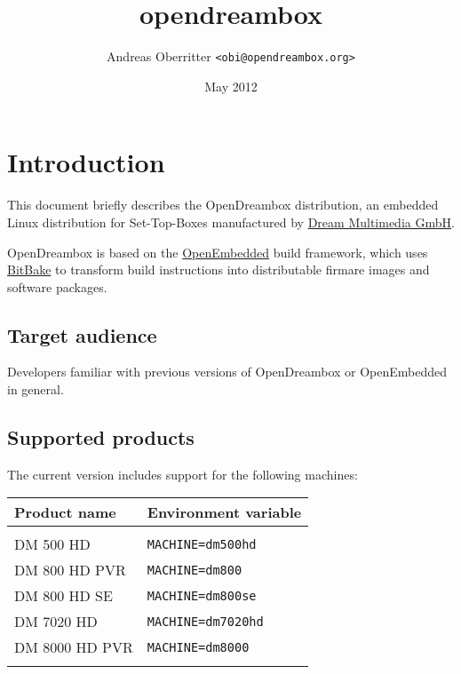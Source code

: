 \documentclass[a4paper]{article}
\newcommand{\shell}[1]{\texttt{\small #1}}
\begin{document}
\title{opendreambox}
\author{Andreas Oberritter \shell{<obi@opendreambox.org>}}
\date{May 2012}
\maketitle
\tableofcontents
\pagebreak

\section{Introduction}
  \begin{flushleft}
    This document briefly describes the OpenDreambox distribution, an embedded Linux
    distribution for Set-Top-Boxes manufactured by \href{http://www.dream-multimedia-tv.de/}{Dream Multimedia GmbH}.

    OpenDreambox is based on the \href{http://www.openembedded.org/}{OpenEmbedded} build framework, which
    uses \href{http://bitbake.berlios.de/}{BitBake} to transform build instructions into
    distributable firmare images and software packages.
  \end{flushleft}

  \subsection{Target audience}
    \begin{flushleft}
      Developers familiar with previous versions of OpenDreambox or OpenEmbedded
      in general.
    \end{flushleft}

  \subsection{Supported products}
    \label{products}
    \begin{flushleft}
      The current version includes support for the following machines:

        \begin{tabular}{ | l | l | }
          \hline
          \textbf{Product name} & \textbf{Environment variable} \\ \hline
          & \\
          DM 500 HD & \shell{MACHINE=dm500hd} \\
          DM 800 HD PVR & \shell{MACHINE=dm800} \\
          DM 800 HD SE & \shell{MACHINE=dm800se} \\
          DM 7020 HD & \shell{MACHINE=dm7020hd} \\
          DM 8000 HD PVR & \shell{MACHINE=dm8000} \\
          & \\
          \hline
        \end{tabular}
    \end{flushleft}
\end{document}
